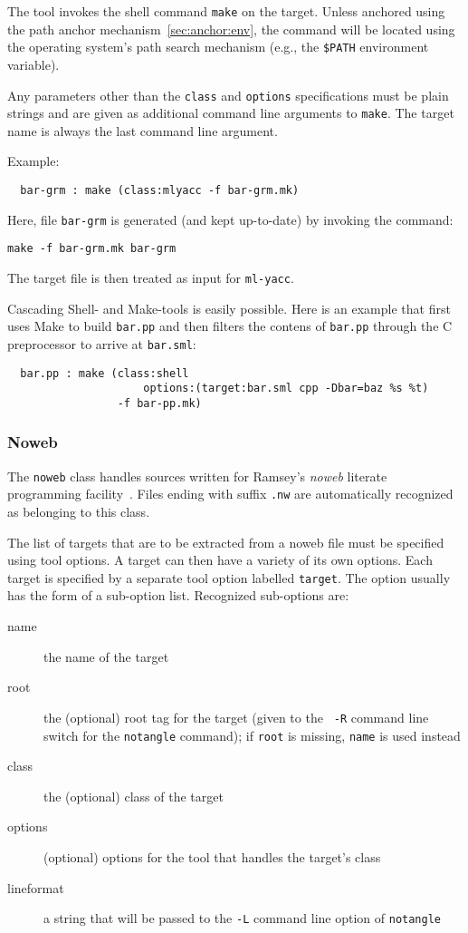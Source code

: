 \documentclass[titlepage,letterpaper]{article}
\begin{document}
The tool invokes the shell command {\tt make} on the target.  Unless
anchored using the path anchor mechanism~\ref{sec:anchor:env}, the
command will be located using the operating system's path search
mechanism (e.g., the {\tt \$PATH} environment variable).

Any parameters other than the {\tt class} and {\tt options}
specifications must be plain strings and are given as additional
command line arguments to {\tt make}.  The target name is always the
last command line argument.

Example:

\begin{verbatim}
  bar-grm : make (class:mlyacc -f bar-grm.mk)
\end{verbatim}

Here, file {\tt bar-grm} is generated (and kept up-to-date) by
invoking the command:
\begin{verbatim}
make -f bar-grm.mk bar-grm
\end{verbatim}
\noindent The target file is then treated as input for {\tt ml-yacc}.

Cascading Shell- and Make-tools is easily possible.  Here is an
example that first uses Make to build {\tt bar.pp} and then filters
the contens of {\tt bar.pp} through the C preprocessor to arrive at
{\tt bar.sml}:

\begin{verbatim}
  bar.pp : make (class:shell
                     options:(target:bar.sml cpp -Dbar=baz %s %t)
                 -f bar-pp.mk)
\end{verbatim}

\subsubsection*{Noweb}

The {\tt noweb} class handles sources written for Ramsey's {\it noweb}
literate programming facility~\cite{ramsey:simplified}.  Files ending
with suffix {\tt .nw} are automatically recognized as belonging to
this class.

The list of targets that are to be extracted from a noweb file must be
specified using tool options.  A target can then have a variety of its
own options.  Each target is specified by a separate tool option
labelled {\tt target}.  The option usually has the form of a
sub-option list.  Recognized sub-options are:

\begin{description}
\item[name] the name of the target
\item[root] the (optional) root tag for the target (given to the {\tt
-R} command line switch for the {\tt notangle} command); if {\tt root}
is missing, {\tt name} is used instead
\item[class] the (optional) class of the target
\item[options] (optional) options for the tool that handles the
target's class
\item[lineformat] a string that will be passed to the {\tt -L} command
line option of {\tt notangle}
\end{description}
\end{document}
